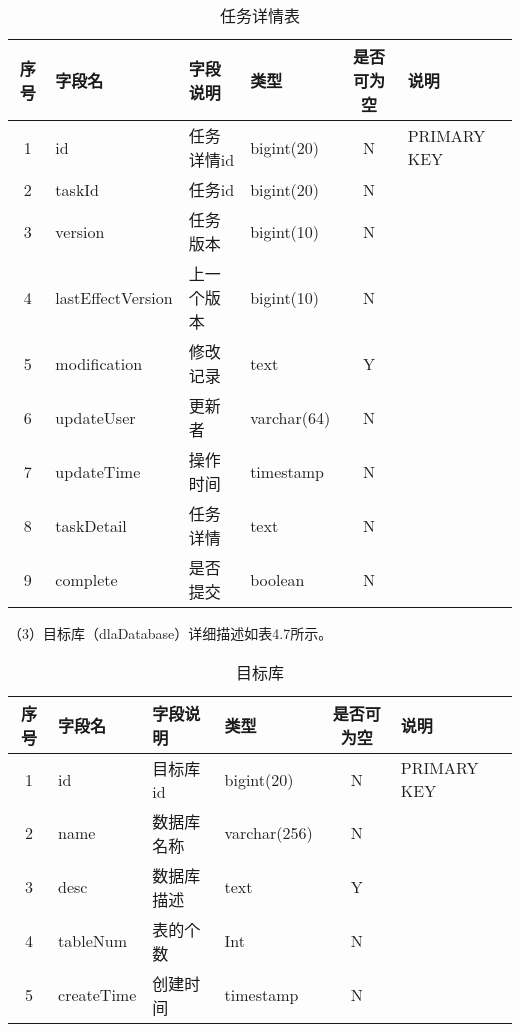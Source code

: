 \begin{table}[h]
  \centering
  \caption{任务详情表}
  \label{tab:exampletable}
  \begin{tabular}{clllcl}
    \toprule
    序号  & 字段名              & 字段说明     & 类型           & 是否可为空   & 说明  \\
    \midrule
    1    & id                 & 任务详情id   & bigint(20)     & N          & PRIMARY KEY    \\
    2    & taskId             & 任务id      & bigint(20)     & N          &    \\
    3    & version            & 任务版本     & bigint(10)     & N          &   \\
    4    & lastEffectVersion  & 上一个版本   & bigint(10)     & N          &   \\
    5    & modification       & 修改记录     & text           & Y          &   \\
    6    & updateUser         & 更新者       & varchar(64)   & N          &    \\
    7    & updateTime         & 操作时间     & timestamp      & N          &   \\
    8    & taskDetail         & 任务详情     & text           & N          &   \\
    9    & complete           & 是否提交     & boolean        & N          &   \\
    \bottomrule
  \end{tabular}
\end{table}

（3）目标库（dlaDatabase）详细描述如表4.7所示。

\begin{table}[h]
  \centering
  \caption{目标库}
  \label{tab:exampletable}
  \begin{tabular}{clllcl}
    \toprule
    序号  & 字段名              & 字段说明     & 类型           & 是否可为空   & 说明  \\
    \midrule
    1    & id                 & 目标库id     & bigint(20)    & N          & PRIMARY KEY    \\
    2    & name               & 数据库名称    & varchar(256)  & N          &    \\
    3    & desc               & 数据库描述    & text          & Y          &   \\
    4    & tableNum           & 表的个数      & Int           & N          &   \\
    5    & createTime         & 创建时间      & timestamp     & N          &   \\
    \bottomrule
  \end{tabular}
\end{table}

